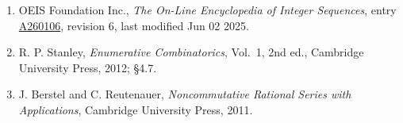 \documentclass[11pt]{article}
\theoremstyle{definition}
\begin{document}
\begin{enumerate}

\item OEIS Foundation Inc., \emph{The On-Line Encyclopedia of Integer Sequences}, entry \href{https://oeis.org/A260106}{A260106}, revision 6, last modified Jun 02 2025.

\item R. P. Stanley, \emph{Enumerative Combinatorics}, Vol.~1, 2nd ed., Cambridge University Press, 2012; \S4.7.

\item J. Berstel and C. Reutenauer, \emph{Noncommutative Rational Series with Applications}, Cambridge University Press, 2011.

\end{enumerate}
\end{document}
